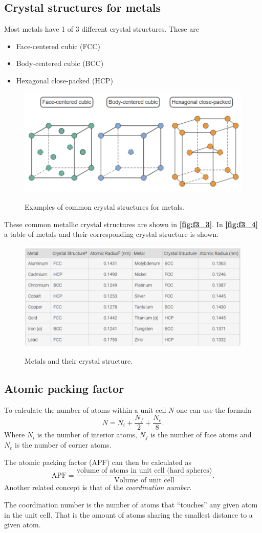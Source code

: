 \subsection{Crystal structures for metals}
Most metals have 1 of 3 different crystal structures. These are
\begin{itemize}
  \item Face-centered cubic (FCC)
  \item Body-centered cubic (BCC)
  \item Hexagonal close-packed (HCP)
\end{itemize}
\begin{figure} [ht]
  \centering
  \caption{Examples of common crystal structures for metals.}
  \includegraphics[width=0.5\linewidth]{./figures/f3_3.png}
  \label{fig:f3_3}
\end{figure}
These common metallic crystal structures are shown in \textbf{\autoref{fig:f3_3}}. In \textbf{\autoref{fig:f3_4}} a table of metals and their corresponding crystal structure is shown.
\begin{figure} [ht]
  \centering
  \caption{Metals and their crystal structure.}
  \includegraphics[width=0.5\linewidth]{./figures/f3_4.png}
  \label{fig:f3_4}
\end{figure}

\subsection{Atomic packing factor}
To calculate the number of atoms within a unit cell $N$ one can use the formula
\[ 
N = N_i + \frac{N_f}{2} + \frac{N_c}{8}
.\]
Where $N_i$ is the number of interior atoms, $N_f$ is the number of face atoms and $N_c$ is the number of corner atoms.

The atomic packing factor (APF) can then be calculated as
\[ 
\mathrm{APF} = \frac{\text{volume of atoms in unit cell (hard spheres)}}{\text{Volume of unit cell}}
.\]
Another related concept is that of the \textit{coordination number}.
\begin{definition}
  The coordination number is the number of atoms that ``touches'' any given atom in the unit cell. That is the amount of atoms sharing the smallest distance to a given atom.
\end{definition}

